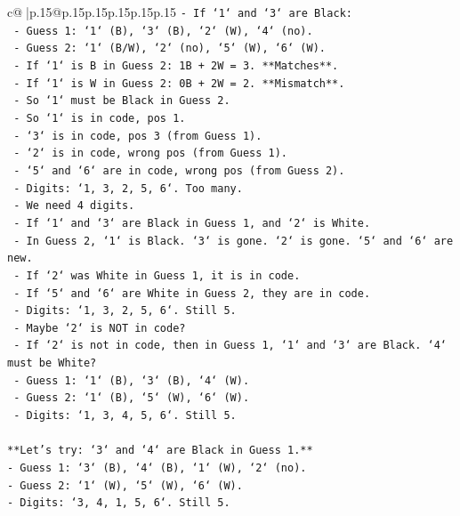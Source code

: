 \documentclass{article}
\begin{document}
{\begin{supertabular}{c@{$\;$}|p{.15\linewidth}@{}p{.15\linewidth}p{.15\linewidth}p{.15\linewidth}p{.15\linewidth}p{.15\linewidth}}
{{{\texttt{{-} If `1` and `3` are Black:} \\
\texttt{    {-} Guess 1: `1` (B), `3` (B), `2` (W), `4` (no).} \\
\texttt{    {-} Guess 2: `1` (B/W), `2` (no), `5` (W), `6` (W).} \\
\texttt{    {-} If `1` is B in Guess 2: 1B + 2W = 3. **Matches**.} \\
\texttt{    {-} If `1` is W in Guess 2: 0B + 2W = 2. **Mismatch**.} \\
\texttt{    {-} So `1` must be Black in Guess 2.} \\
\texttt{    {-} So `1` is in code, pos 1.} \\
\texttt{    {-} `3` is in code, pos 3 (from Guess 1).} \\
\texttt{    {-} `2` is in code, wrong pos (from Guess 1).} \\
\texttt{    {-} `5` and `6` are in code, wrong pos (from Guess 2).} \\
\texttt{    {-} Digits: `1, 3, 2, 5, 6`. Too many.} \\
\texttt{    {-} We need 4 digits.} \\
\texttt{    {-} If `1` and `3` are Black in Guess 1, and `2` is White.} \\
\texttt{    {-} In Guess 2, `1` is Black. `3` is gone. `2` is gone. `5` and `6` are new.} \\
\texttt{    {-} If `2` was White in Guess 1, it is in code.} \\
\texttt{    {-} If `5` and `6` are White in Guess 2, they are in code.} \\
\texttt{    {-} Digits: `1, 3, 2, 5, 6`. Still 5.} \\
\texttt{    {-} Maybe `2` is NOT in code?} \\
\texttt{    {-} If `2` is not in code, then in Guess 1, `1` and `3` are Black. `4` must be White?} \\
\texttt{    {-} Guess 1: `1` (B), `3` (B), `4` (W).} \\
\texttt{    {-} Guess 2: `1` (B), `5` (W), `6` (W).} \\
\texttt{    {-} Digits: `1, 3, 4, 5, 6`. Still 5.} \\
\\ 
\texttt{**Let's try: `3` and `4` are Black in Guess 1.**} \\
\texttt{{-} Guess 1: `3` (B), `4` (B), `1` (W), `2` (no).} \\
\texttt{{-} Guess 2: `1` (W), `5` (W), `6` (W).} \\
\texttt{{-} Digits: `3, 4, 1, 5, 6`. Still 5.} \\
}}}
\end{supertabular}}
\end{document}
